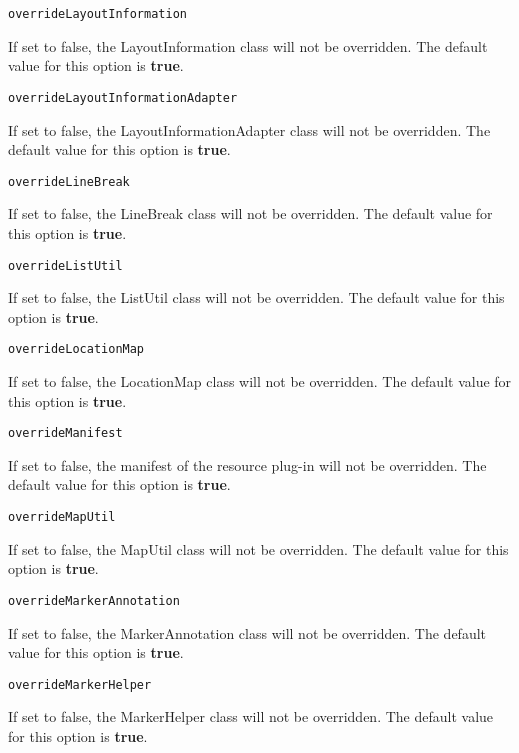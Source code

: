 \noindent\texttt{overrideLayoutInformation}
\begin{myindentpar}{1cm}
If set to false, the LayoutInformation class will not be overridden. The default value for this option is \textbf{true}.
\end{myindentpar}

\noindent\texttt{overrideLayoutInformationAdapter}
\begin{myindentpar}{1cm}
If set to false, the LayoutInformationAdapter class will not be overridden. The default value for this option is \textbf{true}.
\end{myindentpar}

\noindent\texttt{overrideLineBreak}
\begin{myindentpar}{1cm}
If set to false, the LineBreak class will not be overridden. The default value for this option is \textbf{true}.
\end{myindentpar}

\noindent\texttt{overrideListUtil}
\begin{myindentpar}{1cm}
If set to false, the ListUtil class will not be overridden. The default value for this option is \textbf{true}.
\end{myindentpar}

\noindent\texttt{overrideLocationMap}
\begin{myindentpar}{1cm}
If set to false, the LocationMap class will not be overridden. The default value for this option is \textbf{true}.
\end{myindentpar}

\noindent\texttt{overrideManifest}
\begin{myindentpar}{1cm}
If set to false, the manifest of the resource plug-in will not be overridden. The default value for this option is \textbf{true}.
\end{myindentpar}

\noindent\texttt{overrideMapUtil}
\begin{myindentpar}{1cm}
If set to false, the MapUtil class will not be overridden. The default value for this option is \textbf{true}.
\end{myindentpar}

\noindent\texttt{overrideMarkerAnnotation}
\begin{myindentpar}{1cm}
If set to false, the MarkerAnnotation class will not be overridden. The default value for this option is \textbf{true}.
\end{myindentpar}

\noindent\texttt{overrideMarkerHelper}
\begin{myindentpar}{1cm}
If set to false, the MarkerHelper class will not be overridden. The default value for this option is \textbf{true}.
\end{myindentpar}

